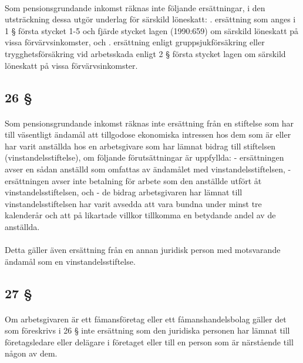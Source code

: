 \documentclass[a4paper,notitlepage,openany,10pt]{book}
\begin{document}
\paragraph*{}
Som pensionsgrundande inkomst räknas inte följande ersättningar, i den utsträckning dessa utgör underlag för särskild löneskatt:
. ersättning som anges i 1 § första stycket 1-5 och fjärde stycket lagen (1990:659) om särskild löneskatt på vissa förvärvsinkomster, och
. ersättning enligt gruppsjukförsäkring eller trygghetsförsäkring vid arbetsskada enligt 2 § första stycket lagen om särskild löneskatt på vissa förvärvsinkomster.
\subsection*{26 §}
\paragraph*{}
Som pensionsgrundande inkomst räknas inte ersättning från en stiftelse som har till väsentligt ändamål att tillgodose ekonomiska intressen hos dem som är eller har varit anställda hos en arbetsgivare som har lämnat bidrag till stiftelsen (vinstandelsstiftelse), om följande förutsättningar är uppfyllda: - ersättningen avser en sådan anställd som omfattas av ändamålet med vinstandelsstiftelsen, - ersättningen avser inte betalning för arbete som den anställde utfört åt vinstandelsstiftelsen, och - de bidrag arbetsgivaren har lämnat till vinstandelsstiftelsen har varit avsedda att vara bundna under minst tre kalenderår och att på likartade villkor tillkomma en betydande andel av de anställda.
\paragraph*{}
Detta gäller även ersättning från en annan juridisk person med motsvarande ändamål som en vinstandelsstiftelse.
\subsection*{27 §}
\paragraph*{}
Om arbetsgivaren är ett fåmansföretag eller ett fåmanshandelsbolag gäller det som föreskrivs i 26 § inte ersättning som den juridiska personen har lämnat till företagsledare eller delägare i företaget eller till en person som är närstående till någon av dem.
\end{document}
